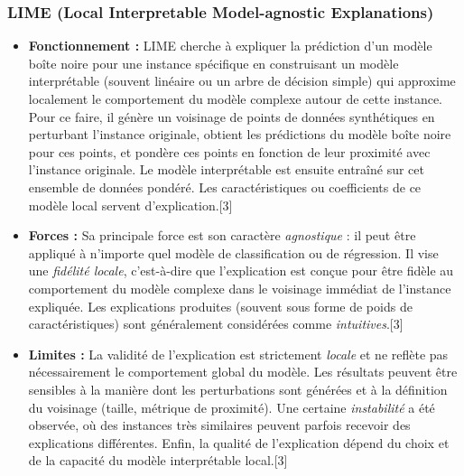 \documentclass[11pt,a4paper]{article}
\begin{document}
\subsubsection{LIME (Local Interpretable Model-agnostic Explanations)}
\begin{itemize}
    \item \textbf{Fonctionnement :} LIME cherche à expliquer la prédiction d'un modèle boîte noire pour une instance spécifique en construisant un modèle interprétable (souvent linéaire ou un arbre de décision simple) qui approxime localement le comportement du modèle complexe autour de cette instance. Pour ce faire, il génère un voisinage de points de données synthétiques en perturbant l'instance originale, obtient les prédictions du modèle boîte noire pour ces points, et pondère ces points en fonction de leur proximité avec l'instance originale. Le modèle interprétable est ensuite entraîné sur cet ensemble de données pondéré. Les caractéristiques ou coefficients de ce modèle local servent d'explication.[3]
    \item \textbf{Forces :} Sa principale force est son caractère \textit{agnostique} : il peut être appliqué à n'importe quel modèle de classification ou de régression. Il vise une \textit{fidélité locale}, c'est-à-dire que l'explication est conçue pour être fidèle au comportement du modèle complexe dans le voisinage immédiat de l'instance expliquée. Les explications produites (souvent sous forme de poids de caractéristiques) sont généralement considérées comme \textit{intuitives}.[3]
    \item \textbf{Limites :} La validité de l'explication est strictement \textit{locale} et ne reflète pas nécessairement le comportement global du modèle. Les résultats peuvent être sensibles à la manière dont les perturbations sont générées et à la définition du voisinage (taille, métrique de proximité). Une certaine \textit{instabilité} a été observée, où des instances très similaires peuvent parfois recevoir des explications différentes. Enfin, la qualité de l'explication dépend du choix et de la capacité du modèle interprétable local.[3]
\end{itemize}
\end{document}

